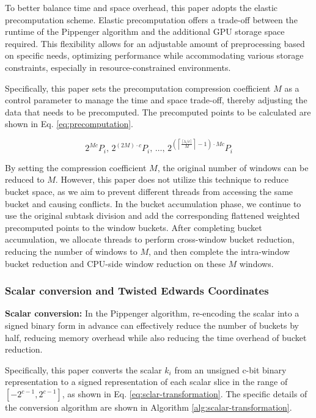 \documentclass[conference]{IEEEtran}
\begin{document}
To better balance time and space overhead, this paper adopts the elastic precomputation scheme. Elastic precomputation offers a trade-off between the runtime of the Pippenger algorithm and the additional GPU storage space required. This flexibility allows for an adjustable amount of preprocessing based on specific needs, optimizing performance while accommodating various storage constraints, especially in resource-constrained environments.

Specifically, this paper sets the precomputation compression coefficient \( M \) as a control parameter to manage the time and space trade-off, thereby adjusting the data that needs to be precomputed. The precomputed points to be calculated are shown in Eq. \eqref{eq:precomputation}.

\begin{equation}
\label{eq:precomputation}
    2^{Mc} P_i, \, 2^{(2M) \cdot c} P_i, \, \ldots, \, 2^{\left(\left\lceil \frac{\lceil \lambda / c \rceil}{M} \right\rceil - 1\right) \cdot Mc} P_i
\end{equation}

By setting the compression coefficient $M$, the original number of windows can be reduced to $M$. However, this paper does not utilize this technique to reduce bucket space, as we aim to prevent different threads from accessing the same bucket and causing conflicts. In the bucket accumulation phase, we continue to use the original subtask division and add the corresponding flattened weighted precomputed points to the window buckets. After completing bucket accumulation, we allocate threads to perform cross-window bucket reduction, reducing the number of windows to $M$, and then complete the intra-window bucket reduction and CPU-side window reduction on these $M$ windows.


\subsubsection{\textbf{Scalar conversion and Twisted Edwards Coordinates}}
\textbf{Scalar conversion: } In the Pippenger algorithm, re-encoding the scalar into a signed binary form in advance can effectively reduce the number of buckets by half, reducing memory overhead while also reducing the time overhead of bucket reduction. 

Specifically, this paper converts the scalar $k_i$ from an unsigned c-bit binary representation to a signed representation of each scalar slice in the range of $\left[-2^{c-1}, 2^{c-1}\right]$, as shown in Eq. \eqref{eq:sclar-transformation}. The specific details of the conversion algorithm are shown in Algorithm \ref{alg:scalar-transformation}.
\end{document}
